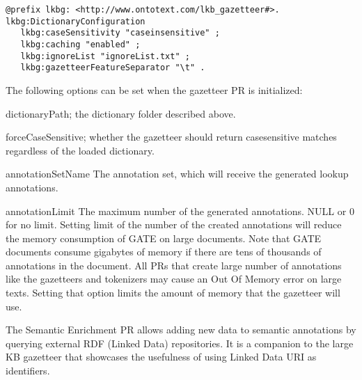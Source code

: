 \begin{pverbatimbox}
\begin{small}\begin{verbatim}
@prefix lkbg: <http://www.ontotext.com/lkb_gazetteer#>.
lkbg:DictionaryConfiguration 
   lkbg:caseSensitivity "caseinsensitive" ;
   lkbg:caching "enabled" ;
   lkbg:ignoreList "ignoreList.txt" ;
   lkbg:gazetteerFeatureSeparator "\t" .
\end{verbatim}\end{small}
\end{pverbatimbox}




The following options can be set when the gazetteer PR is initialized:

\begin{plist}

\item{} dictionaryPath; the dictionary folder described above.

\item{} forceCaseSensitive; whether the gazetteer should return
casesensitive matches regardless of the loaded dictionary.

\end{plist}

\begin{plist}

\item{} annotationSetName  The annotation set, which will receive
the generated lookup annotations.

\item{} annotationLimit  The maximum number of the generated
annotations. NULL or 0 for no limit. Setting limit of the number of the
created annotations will reduce the memory consumption of GATE on large
documents. Note that GATE documents consume gigabytes of memory if there are
tens of thousands of annotations in the document. All PRs that create large
number of annotations like the gazetteers and tokenizers may cause an Out Of
Memory error on large texts. Setting that option limits the amount of memory
that the gazetteer will use.

\end{plist}


The Semantic Enrichment PR allows adding new data to semantic annotations by
querying external RDF (Linked Data) repositories. It is a companion to the
large KB gazetteer that showcases the usefulness of using Linked Data URI as
identifiers.

